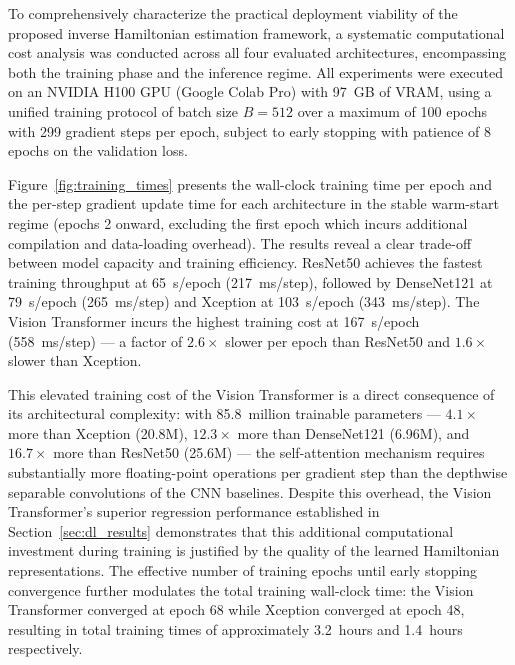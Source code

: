\documentclass[a4paper,fleqn]{cas-sc}
\begin{document}
To comprehensively characterize the practical deployment 
viability of the proposed inverse Hamiltonian estimation 
framework, a systematic computational cost analysis was 
conducted across all four evaluated architectures, 
encompassing both the training phase and the inference 
regime. All experiments were executed on an NVIDIA H100 
GPU (Google Colab Pro) with 97~GB of VRAM, using a unified
training protocol of batch size $B=512$ over a maximum of 
100 epochs with 299 gradient steps per epoch, subject to 
early stopping with patience of 8 epochs on the validation 
loss.


Figure~\ref{fig:training_times} presents the wall-clock 
training time per epoch and the per-step gradient update 
time for each architecture in the stable warm-start regime 
(epochs 2 onward, excluding the first epoch which incurs 
additional compilation and data-loading overhead). The 
results reveal a clear trade-off between model capacity 
and training efficiency. ResNet50 achieves the fastest 
training throughput at 65~s/epoch (217~ms/step), followed 
by DenseNet121 at 79~s/epoch (265~ms/step) and Xception 
at 103~s/epoch (343~ms/step). The Vision Transformer 
incurs the highest training cost at 167~s/epoch 
(558~ms/step) --- a factor of $2.6\times$ slower per 
epoch than ResNet50 and $1.6\times$ slower than Xception.

This elevated training cost of the Vision Transformer 
is a direct consequence of its architectural complexity: 
with 85.8~million trainable parameters --- $4.1\times$ 
more than Xception (20.8M), $12.3\times$ more than 
DenseNet121 (6.96M), and $16.7\times$ more than 
ResNet50 (25.6M) --- the self-attention mechanism 
requires substantially more floating-point operations per 
gradient step than the depthwise separable convolutions 
of the CNN baselines. Despite this overhead, the Vision 
Transformer's superior regression performance 
established in Section~\ref{sec:dl_results} demonstrates 
that this additional computational investment during 
training is justified by the quality of the learned 
Hamiltonian representations. The effective number of 
training epochs until early stopping convergence further 
modulates the total training wall-clock time: the Vision 
Transformer converged at epoch 68 while Xception 
converged at epoch 48, resulting in total training 
times of approximately 3.2~hours and 1.4~hours 
respectively.
\end{document}
